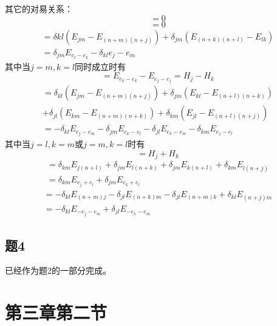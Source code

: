 \documentclass{ctexart}
\begin{document}
	其它的对易关系：
	\begin{equation}
	[E_{e_j+e_k},E_{e_l+e_m}]=0
	\end{equation}
	\begin{equation}
	[E_{-e_j-e_k},E_{-e_l-e_m}]=0
	\end{equation}
	\begin{multline}
	[E_{e_j-e_k},E_{e_l-e_m}]=\delta{kl}(E_{jm}-E_{(n+m)(n+j)})+\delta_{jm}(E_{(n+k)(n+l)}-E_{lk})\\=\delta_{jm}E_{e_l-e_k}-\delta_{kl}{e_j-e_m}
	\end{multline}
	其中当$j=m,k=l$同时成立时有
	\begin{equation}
	[E_{e_j-e_k},E_{e_k-e_j}]=E_{e_k-e_k}-E_{e_j-e_j}=H_j-H_k
	\end{equation}
	\begin{multline}
	[E_{e_j+e_k},E_{-e_l-e_m}]=\delta_{kl}(E_{jm}-E_{(n+m)(n+j)})+\delta_{jm}(E_{kl}-E_{(n+l)(n+k)})\\+\delta_{jl}(E_{km}-E_{(n+m)(n+k)})+\delta_{km}(E_{jl}-E_{(n+l)(n+j)})\\=-\delta_{kl}E_{e_j-e_m}-\delta_{jm}E_{e_k-e_l}-\delta_{jl}E_{e_k-e_m}-\delta_{km}E_{e_j-e_l}
	\end{multline}
	其中当$j=l,k=m$或$j=m,k=l$时有
	\begin{equation}
	[E_{e_j+e_k},E_{-e_j-e_k}]=H_j+H_k
	\end{equation}
	\begin{multline}
	[E_{e_j+e_k},E_{e_l-e_m}]=\delta_{km}E_{j(n+l)}+\delta_{jm}E_{l(n+k)}+\delta_{jm}E_{k(n+l)}+\delta_{km}E_{l(n+j)}\\=\delta_{km}E_{e_j+e_l}+\delta_{jm}E_{e_k+e_l}
	\end{multline}
	\begin{multline}
	[E_{-e_j-e_k},E_{e_l-e_m}]=-\delta_{kl}E_{(n+m)j}-\delta_{jl}E_{(n+k)m}-\delta_{jl}E_{(n+m)k}+\delta_{kl}E_{(n+j)m}\\=-\delta_{kl}E_{-e_j-e_m}+\delta_{jl}E_{-e_k-e_m}
	\end{multline}
	
	\subsection{题4}
	
	已经作为题2的一部分完成。
		
	\section{第三章第二节}
	
\end{document}
